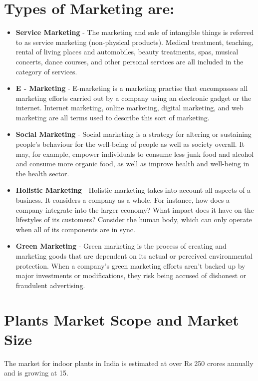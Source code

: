 \documentclass{article}
\begin{document}
\section{Types of Marketing are: }
\begin{itemize}
    \item {\textbf{Service Marketing}} - The marketing and sale of intangible things is referred to as service marketing (non-physical products). Medical treatment, teaching, rental of living places and automobiles, beauty treatments, spas, musical concerts, dance courses, and other personal services are all included in the category of services.
    \item {\textbf{E - Marketing}} - E-marketing is a marketing practise that encompasses all marketing efforts carried out by a company using an electronic gadget or the internet. Internet marketing, online marketing, digital marketing, and web marketing are all terms used to describe this sort of marketing.
    \item {\textbf{Social Marketing}} - Social marketing is a strategy for altering or sustaining people's behaviour for the well-being of people as well as society overall. It may, for example, empower individuals to consume less junk food and alcohol and consume more organic food, as well as improve health and well-being in the health sector.
    \item {\textbf{Holistic Marketing}} - Holistic marketing takes into account all aspects of a business. It considers a company as a whole. For instance, how does a company integrate into the larger economy? What impact does it have on the lifestyles of its customers? Consider the human body, which can only operate when all of its components are in sync.
    \item {\textbf{Green Marketing}} - Green marketing is the process of creating and marketing goods that are dependent on its actual or perceived environmental protection. When a company's green marketing efforts aren't backed up by major investments or modifications, they risk being accused of dishonest or fraudulent advertising.
\end{itemize}

\setlength{\parskip}{1em}

\section{Plants Market Scope and Market Size}

\large The market for indoor plants in India is estimated at over Rs 250 crores annually and is growing at 15. 
\end{document}
